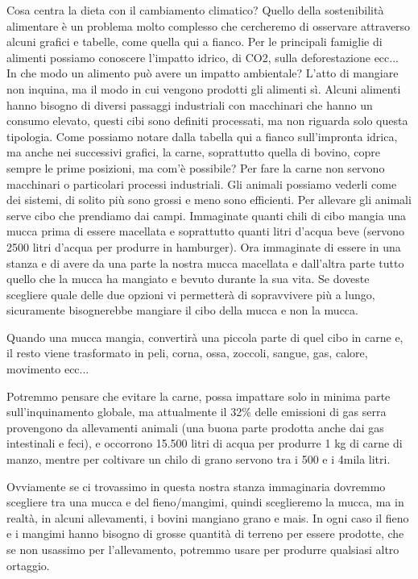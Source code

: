 \documentclass[12pt]{book} %
\begin{document}
Cosa centra la dieta con il cambiamento climatico? Quello della sostenibilità alimentare è un problema molto complesso che cercheremo di osservare attraverso alcuni grafici e tabelle, come quella qui a fianco. Per le principali famiglie di alimenti possiamo conoscere l'impatto idrico, di CO2, sulla deforestazione ecc... In che modo un alimento può avere un impatto ambientale? L'atto di mangiare non inquina, ma il modo in cui vengono prodotti gli alimenti sì. Alcuni alimenti hanno bisogno di diversi passaggi industriali con macchinari che hanno un consumo elevato, questi cibi sono definiti processati, ma non riguarda solo questa tipologia. Come possiamo notare dalla tabella qui a fianco sull'impronta idrica, ma anche nei successivi grafici, la carne, soprattutto quella di bovino, copre sempre le prime posizioni, ma com'è possibile? Per fare la carne non servono macchinari o particolari processi industriali.
Gli animali possiamo vederli come dei sistemi, di solito più sono grossi e meno sono efficienti. Per allevare gli animali serve cibo che prendiamo dai campi. Immaginate quanti chili di cibo mangia una mucca prima di essere macellata e soprattutto quanti litri d'acqua beve
(servono 2500 litri d'acqua per produrre in hamburger). Ora immaginate di essere in una stanza e di avere da una parte
la nostra mucca macellata e dall'altra parte tutto quello che la mucca ha mangiato e bevuto durante la sua vita.
Se doveste scegliere quale delle due opzioni vi permetterà di sopravvivere più a lungo, sicuramente bisognerebbe mangiare il cibo della mucca e non la mucca.

Quando una mucca mangia, convertirà una piccola parte di quel cibo in carne e, il resto viene trasformato in peli, corna, ossa, zoccoli, sangue, gas, calore, movimento ecc...

Potremmo pensare che evitare la carne, possa impattare solo in minima parte sull'inquinamento globale, ma attualmente il 32\% delle emissioni di gas serra provengono da allevamenti animali
(una buona parte prodotta anche dai gas intestinali e feci), e occorrono 15.500 litri di acqua per produrre 1 kg di carne di manzo, mentre per coltivare un chilo di grano servono tra i 500 e i 4mila litri.

Ovviamente se ci trovassimo in questa nostra stanza immaginaria dovremmo scegliere tra una mucca e del fieno/mangimi,
quindi sceglieremo la mucca, ma in realtà, in alcuni allevamenti, i bovini mangiano grano e mais.
In ogni caso il fieno e i mangimi hanno bisogno di grosse quantità di terreno per essere prodotte, che se non usassimo per
l'allevamento, potremmo usare per produrre qualsiasi altro ortaggio.
\end{document}
